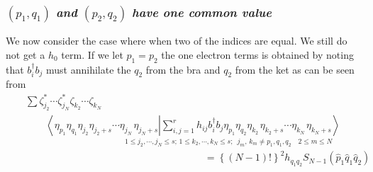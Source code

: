 \subsubsection{$\left( p_{1},q_{1}\right) $ {\it and} $\left(
p_{2},q_{2}\right) $ {\it have one common value}}

We now consider the case where when two of the indices are equal. We still
do not get a $h_{0}$ term. If we let $p_{1}=p_{2}$ the one electron terms is
obtained by noting that $b_{i}^{\dagger }b_{j}$ must annihilate the $q_{2}$
from the bra and $q_{2}$ from the ket as can be seen from 
\begin{eqnarray}
&&\sum \zeta _{j_{2}}^{\ast }\cdots \zeta _{j_{N}}^{\ast }\zeta
_{k_{2}}\cdots \zeta _{k_{N}}  \nonumber \\
&&\qquad \left\langle \eta _{p_{1}}\eta _{q_{1}}\eta _{j_{2}}\eta
_{j_{2}+s}\cdots \eta _{j_{N}\,}\eta _{j_{N}+s}\left|
\sum_{i,j=1}^{r}h_{ij}b_{i}^{\dagger }b_{j}\eta _{p_{1}}\eta _{q_{2}}\eta
_{k_{2}\,}\eta _{k_{2}+s}\cdots \eta _{k_{N}\,}\eta _{k_{N}+s}\right.
\right\rangle  \nonumber \\
&&\qquad \qquad \qquad \qquad \qquad _{1\leq j_{2},\cdots ,j_{N}\leq
s;\,1\leq k_{2},\cdots ,k_{N}\leq s;\,\,\,j_{m},\,k_{m}\neq
p_{1},q_{1},q_{2}\quad 2\leq m\leq N}  \nonumber \\
&&\left. {}\right. \qquad \qquad \qquad \qquad \qquad \qquad \qquad \qquad
\qquad =\left\{ \left( N-1\right) !\right\} ^{2}h_{q_{1}q_{2}}S_{N-1}\left( 
\hat{p}_{1}\hat{q}_{1}\hat{q}_{2}\right)
\end{eqnarray}


